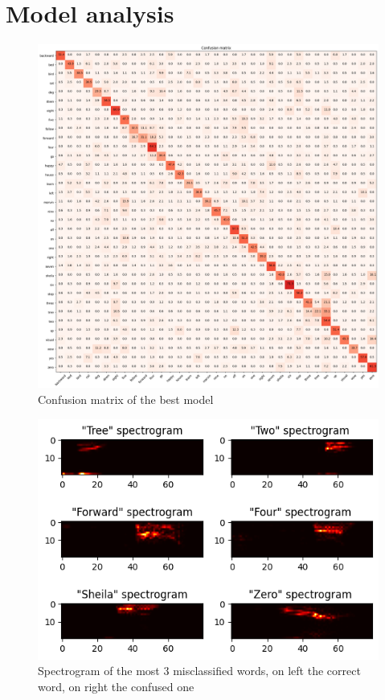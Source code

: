 \documentclass[eng]{class}
\begin{document}
\section{Model analysis}
\begin{figure}[h]
  \centering
  \includegraphics[width=.8\columnwidth]{images/confusion_matrix.png}
  \caption{Confusion matrix of the best model}
  \label{fig-5}
\end{figure}

\begin{figure}[h]
  \centering
  \includegraphics[width=.8\columnwidth]{images/misclassified_words.png}
  \caption{Spectrogram of the most 3 misclassified words, on left the correct word, on right the confused one}
  \label{fig-6}
\end{figure}
\end{document}
